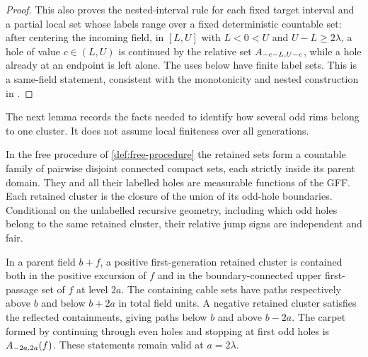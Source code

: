 \begin{proof}
This also proves the nested-interval rule for each fixed target interval
and a partial local set whose labels range over a fixed deterministic
countable set: after centering the incoming field, in \([L,U]\) with
\(L<0<U\) and \(U-L\ge2\lambda\), a hole of value \(c\in(L,U)\) is continued by the relative
set \(A_{-c-L,U-c}\), while a hole already at an endpoint is left
alone. The uses below have finite label sets. This is a same-field
statement, consistent with the monotonicity and nested construction in
\cite[Section~3.2]{AS2018}.
\end{proof}

The next lemma records the facts needed to identify how several odd
rims belong to one cluster. It does not assume local finiteness over
all generations.

\begin{lemma}
\label{lem:canonical-geometry}
In the free procedure of \cref{def:free-procedure} the retained sets
form a countable family of pairwise disjoint connected compact sets,
each strictly inside its parent domain. They and all their labelled
holes are measurable functions of the GFF. Each retained cluster is
the closure of the union of its odd-hole boundaries. Conditional on
the unlabelled recursive geometry, including which odd holes belong
to the same retained cluster, their relative jump signs are
independent and fair.

In a parent field \(b+f\), a positive first-generation retained
cluster is contained both in the positive excursion of \(f\) and in
the boundary-connected upper first-passage set of \(f\) at level
\(2a\). The containing cable sets have paths respectively above
\(b\) and below \(b+2a\) in total field units.
A negative retained cluster satisfies the reflected containments,
giving paths below \(b\) and above \(b-2a\). The carpet formed by
continuing through even holes and stopping at first odd holes is
\(A_{-2a,2a}(f)\). These statements remain valid at
\(a=2\lambda\).
\end{lemma}

